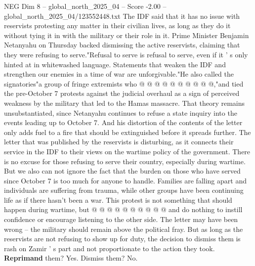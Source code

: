 \begin{textsample}{NEG Dim 8 – global\_north\_2025\_04 – Score -2.00 – global\_north\_2025\_04/123552448.txt}
The IDF said that it has no issue with reservists protesting any matter in their civilian lives, as long as they do it without tying it in with the military or their role in it.
Prime Minister Benjamin Netanyahu on Thursday backed dismissing the active reservists, claiming that they were refusing to serve."Refusal to serve is refusal to serve, even if it ' s only hinted at in whitewashed language.
Statements that weaken the IDF and strengthen our enemies in a time of war are unforgivable."He also called the signatories"a group of fringe extremists who @ @ @ @ @ @ @ @ @ @,"and tied the pre-October 7 protests against the judicial overhaul as a sign of perceived weakness by the military that led to the Hamas massacre.
That theory remains unsubstantiated, since Netanyahu continues to refuse a state inquiry into the events leading up to October 7.
And his distortion of the contents of the letter only adds fuel to a fire that should be extinguished before it spreads further.
The letter that was published by the reservists is disturbing, as it connects their service in the IDF to their views on the wartime policy of the government.
There is no excuse for those refusing to serve their country, especially during wartime.
But we also can not ignore the fact that the burden on those who have served since October 7 is too much for anyone to handle.
Families are falling apart and individuals are suffering from trauma, while other groups have been continuing life as if there hasn't been a war.
This protest is not something that should happen during wartime, but @ @ @ @ @ @ @ @ @ @ and do nothing to instill confidence or encourage listening to the other side.
The letter may have been wrong -- the military should remain above the political fray.
But as long as the reservists are not refusing to show up for duty, the decision to dismiss them is rash on Zamir ' s part and not proportionate to the action they took. \textbf{Reprimand} them?
Yes.
Dismiss them?
No.

\end{textsample}

